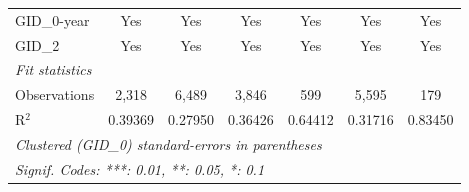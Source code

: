 \begin{table}[htbp]
\begin{tabular}{lcccccc}
      GID\_0-year                        & Yes      & Yes           & Yes            & Yes          & Yes      & Yes\\  
      GID\_2                             & Yes      & Yes           & Yes            & Yes          & Yes      & Yes\\  
      \midrule
      \emph{Fit statistics}\\
      Observations                       & 2,318    & 6,489         & 3,846          & 599          & 5,595    & 179\\  
      R$^2$                              & 0.39369  & 0.27950       & 0.36426        & 0.64412      & 0.31716  & 0.83450\\  
      \midrule \midrule
      \multicolumn{7}{l}{\emph{Clustered (GID\_0) standard-errors in parentheses}}\\
      \multicolumn{7}{l}{\emph{Signif. Codes: ***: 0.01, **: 0.05, *: 0.1}}\\
   \end{tabular}
\end{table}



